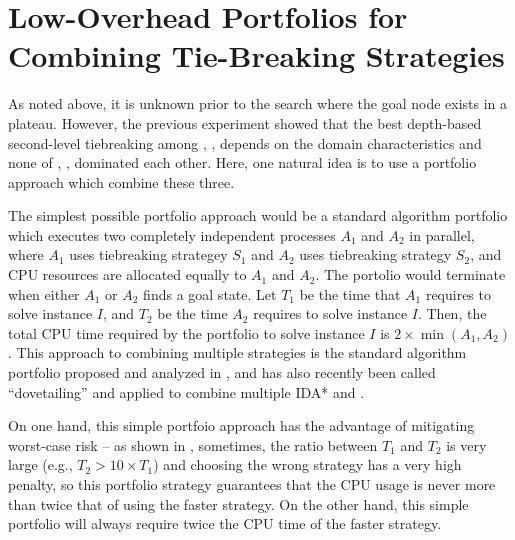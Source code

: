 %  

\section{Low-Overhead Portfolios for Combining Tie-Breaking Strategies}

As noted above, it is unknown prior to the search where the goal node
exists in a plateau. However, the previous experiment showed that the
best depth-based second-level tiebreaking among \ld, \fd, \rd depends on
the domain characteristics and none of \ld, \fd, \rd dominated each
other.  Here, one natural idea is to use a portfolio approach which
combine these three.

The simplest possible portfolio approach would be a standard algorithm portfolio
which executes two completely independent \astar processes $A_1$ and $A_2$ in parallel, where $A_1$ uses tiebreaking strategey $S_1$ and $A_2$ uses tiebreaking strategy $S_2$, and CPU resources are allocated equally to $A_1$ and $A_2$.
The portolio would terminate when either $A_1$ or $A_2$ finds a goal state.
Let $T_1$ be the time that $A_1$ requires to solve instance $I$, and $T_2$ be the
time $A_2$ requires to solve instance $I$. Then, the total CPU time
required by the portfolio to solve instance $I$ is $2\times\min(A_1,A_2)$. This approach to combining multiple strategies is the standard algorithm portfolio proposed and analyzed in \cite{HubermanLH97,GomesS01}, and has also recently been called ``dovetailing'' and applied to combine multiple IDA* and \astar  \cite{ValenzanoSSBK10}. %

On one hand, this simple portfoio approach has the advantage of mitigating worst-case risk -- as shown in , sometimes, the ratio between $T_1$ and $T_2$ is very large (e.g., $T_2 > 10\times T_1$) and choosing the wrong strategy has a very high penalty, so this portfolio strategy guarantees that the CPU usage is never more than twice that of using the faster strategy.
On the other hand, this simple portfolio will always require twice the
CPU time of the faster strategy.

